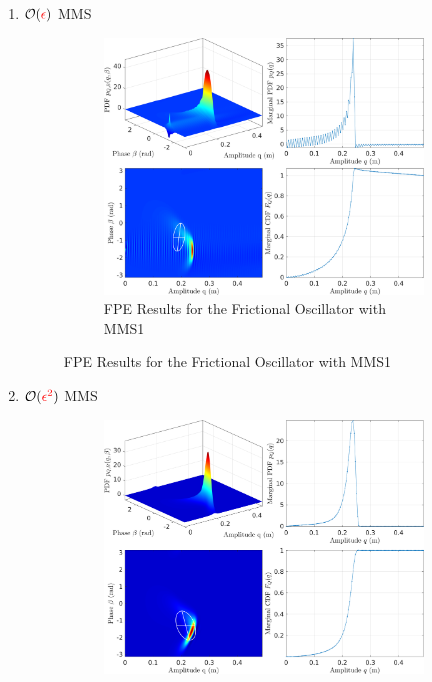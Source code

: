 \documentclass[11pt]{article}
\begin{document}
\begin{enumerate}
\item \(\mathcal{O}(\textcolor{red}{\epsilon})\) MMS
\label{sec:org56effe7}
\begin{figure}
\begin{figure}[htbp]
\centering
\includegraphics[width=.9\linewidth]{FIGS/G3_SDOFFPE_jenkins_mms1.png}
\caption{FPE Results for the Frictional Oscillator with MMS1}
\end{figure}
\end{figure}
\item \(\mathcal{O}(\textcolor{red}{\epsilon^2})\) MMS
\label{sec:org75a84f6}
\begin{figure}
\begin{figure}[htbp]
\centering
\includegraphics[width=.9\linewidth]{FIGS/G3_SDOFFPE_jenkins_mms2.png}

\end{figure}
\end{figure}
\end{enumerate}
\end{document}
